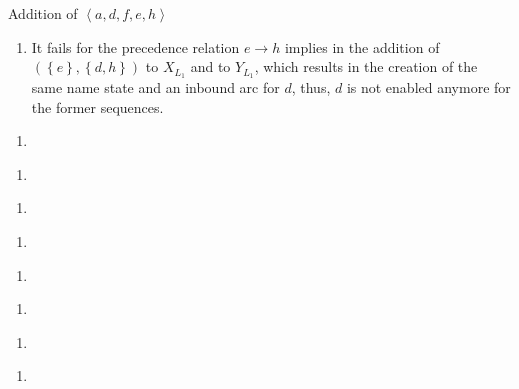 \documentclass[a4paper]{report}
\begin{document}
Addition of $\left<a,d,f,e,h \right>$ 
\begin{enumerate}
    \item It fails for the precedence relation $e\to h$ implies in the addition of $\left( \left\{
	e\right\} , \left\{ d,h \right\}  \right) $ to $X_{L_1}$ and to $Y_{L_1}$, which results
	in the creation of the same name state and an inbound arc for $d$, thus, $d$ is not
	enabled anymore for the former sequences.
\end{enumerate}


\begin{enumerate}
    \item 
\end{enumerate}

\begin{enumerate}
    \item 
\end{enumerate}

\begin{enumerate}
    \item 
\end{enumerate}

\begin{enumerate}
    \item 
\end{enumerate}

\begin{enumerate}
    \item 
\end{enumerate}

\begin{enumerate}
    \item 
\end{enumerate}

\begin{enumerate}
    \item 
\end{enumerate}

\begin{enumerate}
    \item 
\end{enumerate}
\end{document}
